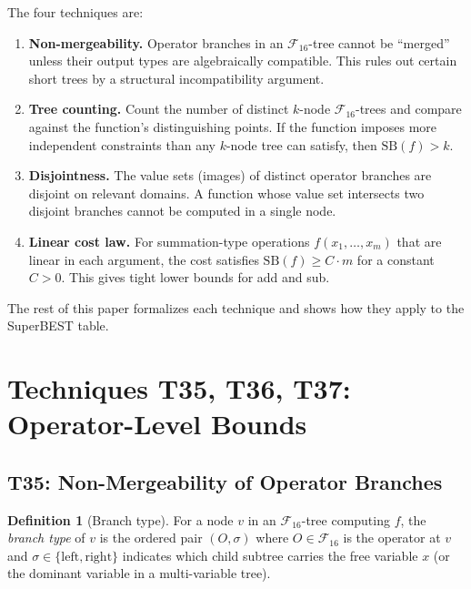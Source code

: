 \documentclass[12pt,a4paper]{article}
\theoremstyle{definition}
\newtheorem{definition}[theorem]{Definition}
\newcommand{\F}{\mathcal{F}_{16}}
\newcommand{\SB}{\mathrm{SB}}
\begin{document}
The four techniques are:
\begin{enumerate}
\item[\textbf{T35}] \textbf{Non-mergeability.}  Operator branches in an
  $\F$-tree cannot be ``merged'' unless their output types are algebraically
  compatible.  This rules out certain short trees by a structural incompatibility argument.
\item[\textbf{T36}] \textbf{Tree counting.}  Count the number of distinct
  $k$-node $\F$-trees and compare against the function's distinguishing points.
  If the function imposes more independent constraints than any $k$-node tree
  can satisfy, then $\SB(f) > k$.
\item[\textbf{T37}] \textbf{Disjointness.}  The value sets (images) of distinct
  operator branches are disjoint on relevant domains.  A function whose value
  set intersects two disjoint branches cannot be computed in a single node.
\item[\textbf{T40}] \textbf{Linear cost law.}  For summation-type operations
  $f(x_1, \ldots, x_m)$ that are linear in each argument, the cost satisfies
  $\SB(f) \ge C \cdot m$ for a constant $C > 0$.  This gives tight lower bounds
  for add and sub.
\end{enumerate}

The rest of this paper formalizes each technique and shows how they apply to
the SuperBEST table.

\section{Techniques T35, T36, T37: Operator-Level Bounds}
\label{sec:operator}

\subsection{T35: Non-Mergeability of Operator Branches}

\begin{definition}[Branch type]
For a node $v$ in an $\F$-tree computing $f$, the \emph{branch type} of $v$
is the ordered pair $(O, \sigma)$ where $O\in\F$ is the operator at $v$ and
$\sigma \in \{\mathrm{left}, \mathrm{right}\}$ indicates which child subtree
carries the free variable $x$ (or the dominant variable in a multi-variable tree).
\end{definition}
\end{document}
